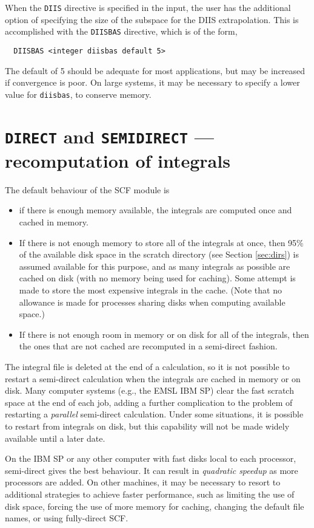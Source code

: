When the \verb+DIIS+ directive is specified in the input, the user has
the additional option of specifying the size of the subspace for the DIIS
extrapolation.  This is accomplished with the \verb+DIISBAS+ directive,
which is of the form,
\begin{verbatim}
  DIISBAS <integer diisbas default 5>
\end{verbatim}
The default of 5 should be adequate for most applications, but may be
increased if convergence is poor.  On large systems, it may be necessary
to specify a lower value for \verb+diisbas+, to conserve memory.

\section{{\tt DIRECT} and {\tt SEMIDIRECT} --- recomputation of integrals}
\label{sec:semidirect}

The default behaviour of the SCF module is
\begin{itemize}
\item if there is enough memory available, the integrals are computed
   once and cached in memory.
 \item If there is not enough memory to store all of the integrals at
   once, then 95\% of the available disk space in the scratch
   directory (see Section \ref{sec:dirs}) is assumed available for
   this purpose, and as many integrals as possible are cached on disk
   (with no memory being used for caching).  Some attempt is made to
   store the most expensive integrals in the cache.  (Note that no
   allowance is made for processes sharing disks when computing
   available space.)
 \item If there is not enough room in memory or on disk for all of the
   integrals, then the ones that are not cached are recomputed in a
   semi-direct fashion.
\end{itemize}

The integral file is deleted at the end of a calculation, so it is not
possible to restart a semi-direct calculation when the integrals are
cached in memory or on disk.  Many computer systems (e.g., the EMSL
IBM SP) clear the fast scratch space at the end of each job, adding a
further complication to the problem of restarting a {\em parallel}
semi-direct calculation.  Under some situations, it is possible to
restart from integrals on disk, but this capability will not be made
widely available until a later date.

On the IBM SP or any other computer with fast disks local to each
processor, semi-direct gives the best behaviour.  It can result in
{\em quadratic speedup} as more processors are added.  On other
machines, it may be necessary to resort to additional strategies to
achieve faster performance, such as limiting the use of disk space,
forcing the use of more memory for caching, changing the default file
names, or using fully-direct SCF.


